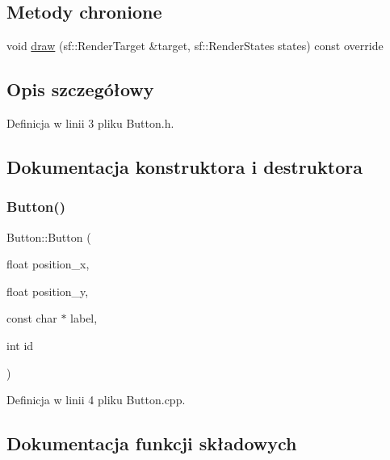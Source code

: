 \subsection*{Metody chronione}
\begin{DoxyCompactItemize}
\item 
void \mbox{\hyperlink{class_button_a94b2be0ad227968afccae8bc297ed99a}{draw}} (sf\+::\+Render\+Target \&target, sf\+::\+Render\+States states) const override
\end{DoxyCompactItemize}


\subsection{Opis szczegółowy}


Definicja w linii 3 pliku Button.\+h.



\subsection{Dokumentacja konstruktora i destruktora}
\mbox{\label{class_button_aeb4926acd6beafa022e3152b7ecbb992}} 
\subsubsection{\texorpdfstring{Button()}{Button()}}
{\footnotesize\ttfamily Button\+::\+Button (\begin{DoxyParamCaption}\item[{float}]{position\+\_\+x,  }\item[{float}]{position\+\_\+y,  }\item[{const char $\ast$}]{label,  }\item[{int}]{id }\end{DoxyParamCaption})}



Definicja w linii 4 pliku Button.\+cpp.



\subsection{Dokumentacja funkcji składowych}
\mbox{\label{class_button_a31dfd83213a96fce828037745fc7e18f}} 
